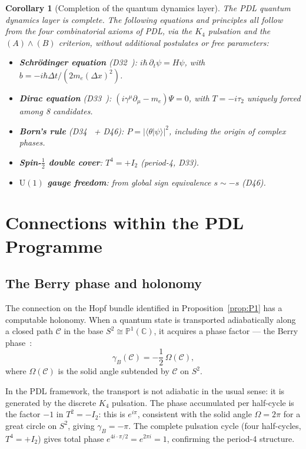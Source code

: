 \documentclass[12pt,a4paper]{article}
\newtheorem{corollary}[theorem]{Corollary}
\newcommand{\hb}{\hbar}
\newcommand{\CC}{\mathbb{C}}
\newcommand{\PP}{\mathbb{P}}
\begin{document}
\begin{corollary}[Completion of the quantum dynamics layer]
\label{cor:QD_complete}
The PDL quantum dynamics layer is complete. The following equations and principles
all follow from the four combinatorial axioms of PDL, via the $K_4$ pulsation
and the $(A)\wedge(B)$ criterion, without additional postulates or free parameters:
\begin{itemize}
\item \textbf{Schrödinger equation} (D32~\cite{PDL_D32_2026}): $i\hb\,\partial_t\psi
      = H\psi$, with $b = -i\hb\Delta t/(2m_e(\Delta x)^2)$.
\item \textbf{Dirac equation} (D33~\cite{PDL_D33_2026}): $(i\gamma^\mu\partial_\mu
      - m_e)\Psi = 0$, with $T = -i\tau_2$ uniquely forced among 8 candidates.
\item \textbf{Born's rule} (D34~\cite{PDL_D34_2026} + D46): $P = |\langle\theta|\psi
      \rangle|^2$, including the origin of complex phases.
\item \textbf{Spin-$\frac{1}{2}$ double cover}: $T^4 = +I_2$ (period-4, D33).
\item \textbf{$\mathrm{U}(1)$ gauge freedom}: from global sign equivalence $s \sim -s$
      (D46).
\end{itemize}
\end{corollary}

\section{Connections within the PDL Programme}
\label{sec:connection}

\subsection{The Berry phase and holonomy}

The connection on the Hopf bundle identified in Proposition~\ref{prop:P1} has a
computable holonomy. When a quantum state is transported adiabatically along a
closed path $\mathcal{C}$ in the base $S^2 \cong \PP^1(\CC)$, it acquires a phase
factor — the Berry phase~\cite{Berry_1984}:
\begin{equation}
\gamma_B(\mathcal{C}) = -\frac{1}{2}\,\Omega(\mathcal{C}),
\label{eq:Berry}
\end{equation}
where $\Omega(\mathcal{C})$ is the solid angle subtended by $\mathcal{C}$ on $S^2$.

In the PDL framework, the transport is not adiabatic in the usual sense: it is
generated by the discrete $K_4$ pulsation. The phase accumulated per half-cycle is
the factor $-1$ in $T^2 = -I_2$: this is $e^{i\pi}$, consistent with the solid angle
$\Omega = 2\pi$ for a great circle on $S^2$, giving $\gamma_B = -\pi$. The complete
pulsation cycle (four half-cycles, $T^4 = +I_2$) gives total phase $e^{4i\cdot\pi/2}
= e^{2\pi i} = 1$, confirming the period-4 structure.
\end{document}
